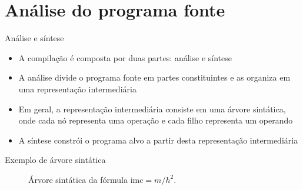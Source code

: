 \section{Análise do programa fonte}

\begin{frame}[fragile]{Análise e síntese}

    \begin{itemize}
        \item A compilação é composta por duas partes: análise e síntese
        \pause

        \item A análise divide o programa fonte em partes constituintes e as organiza em uma representação intermediária
        \pause

        \item Em geral, a representação intermediária consiste em uma árvore sintática, onde cada nó representa uma operação e cada filho representa um
            operando
        \pause

        \item A síntese constrói o programa alvo a partir desta representação intermediária
    \end{itemize}

\end{frame}

\begin{frame}[fragile]{Exemplo de árvore sintática}

    \begin{figure}
        \centering


        \caption{Árvore sintática da fórmula $\mathrm{imc} = m/h^2$.}
    \end{figure}

\end{frame}

